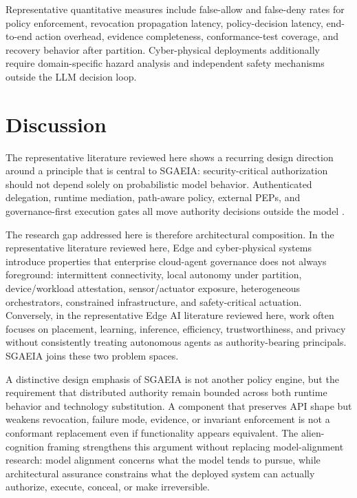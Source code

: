 \documentclass[11pt]{article}
\newcommand{\sgaeia}{\textsc{SGAEIA}}
\begin{document}
Representative quantitative measures include false-allow and false-deny rates for policy enforcement, revocation propagation latency, policy-decision latency, end-to-end action overhead, evidence completeness, conformance-test coverage, and recovery behavior after partition. Cyber-physical deployments additionally require domain-specific hazard analysis and independent safety mechanisms outside the LLM decision loop.

\section{Discussion}
The representative literature reviewed here shows a recurring design direction around a principle that is central to \sgaeia{}: security-critical authorization should not depend solely on probabilistic model behavior. Authenticated delegation, runtime mediation, path-aware policy, external PEPs, and governance-first execution gates all move authority decisions outside the model \cite{south2025authenticateddelegation,kaptein2026policiespaths,tallam2026fiveplane,calboreanu2026lattice,wang2026runtimepep}.

The research gap addressed here is therefore architectural composition. In the representative literature reviewed here, Edge and cyber-physical systems introduce properties that enterprise cloud-agent governance does not always foreground: intermittent connectivity, local autonomy under partition, device/workload attestation, sensor/actuator exposure, heterogeneous orchestrators, constrained infrastructure, and safety-critical actuation. Conversely, in the representative Edge AI literature reviewed here, work often focuses on placement, learning, inference, efficiency, trustworthiness, and privacy without consistently treating autonomous agents as authority-bearing principals. \sgaeia{} joins these two problem spaces.

A distinctive design emphasis of \sgaeia{} is not another policy engine, but the requirement that distributed authority remain bounded across both runtime behavior and technology substitution. A component that preserves API shape but weakens revocation, failure mode, evidence, or invariant enforcement is not a conformant replacement even if functionality appears equivalent. The alien-cognition framing strengthens this argument without replacing model-alignment research: model alignment concerns what the model tends to pursue, while architectural assurance constrains what the deployed system can actually authorize, execute, conceal, or make irreversible.
\end{document}
